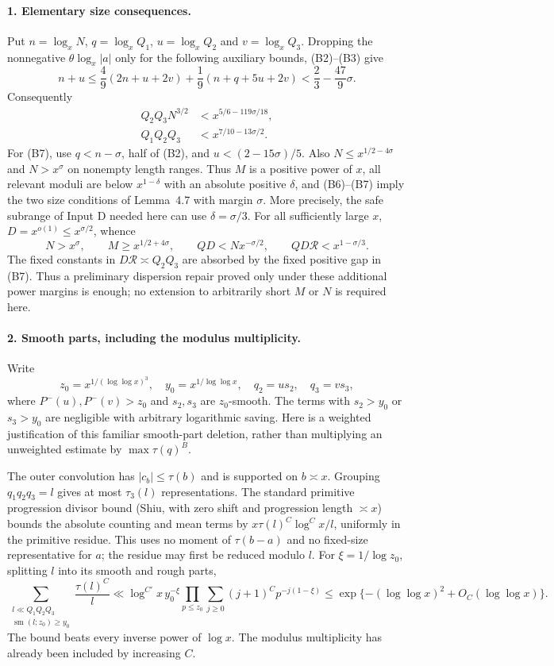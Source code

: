 \paragraph{1. Elementary size consequences.}
Put $n=\log_xN$, $q=\log_xQ_1$, $u=\log_xQ_2$ and
$v=\log_xQ_3$. Dropping the nonnegative $\theta\log_x|a|$
only for the following auxiliary bounds, (B2)--(B3) give
\[
 n+u\le\frac49(2n+u+2v)+\frac19(n+q+5u+2v)
 <\frac23-\frac{47}{9}\sigma.
\]
Consequently
\begin{align}
 Q_2Q_3N^{3/2}&<x^{5/6-119\sigma/18},                    \tag{B6}\\
 Q_1Q_2Q_3&<x^{7/10-13\sigma/2}.                         \tag{B7}
\end{align}
For (B7), use $q<n-\sigma$, half of (B2), and
$u<(2-15\sigma)/5$. Also $N\le x^{1/2-4\sigma}$ and
$N>x^\sigma$ on nonempty length ranges. Thus $M$ is a positive
power of $x$, all relevant moduli are below $x^{1-\delta}$ with
an absolute positive $\delta$, and (B6)--(B7) imply the two size
conditions of Lemma~4.7 with margin $\sigma$.
More precisely, the safe subrange of Input D needed here can use
$\delta=\sigma/3$. For all sufficiently large $x$,
$D=x^{o(1)}\le x^{\sigma/2}$, whence
\[
 N>x^\sigma,\qquad M\ge x^{1/2+4\sigma},\qquad
 QD<Nx^{-\sigma/2},\qquad QD\mathcal R<x^{1-\sigma/3}.
\]
The fixed constants in $D\mathcal R\asymp Q_2Q_3$ are absorbed
by the fixed positive gap in (B7). Thus a preliminary dispersion
repair proved only under these additional power margins is enough;
no extension to arbitrarily short $M$ or $N$ is required here.

\paragraph{2. Smooth parts, including the modulus multiplicity.}
Write
\[
 z_0=x^{1/(\log\log x)^3},\quad y_0=x^{1/\log\log x},
 \quad q_2=u s_2,\quad q_3=v s_3,
\]
where $P^-(u),P^-(v)>z_0$ and $s_2,s_3$ are $z_0$-smooth.
The terms with $s_2>y_0$ or $s_3>y_0$ are negligible with arbitrary
logarithmic saving. Here is a weighted justification of this familiar
smooth-part deletion, rather than multiplying an unweighted estimate
by $\max\tau(q)^B$.

The outer convolution has $|c_b|\le\tau(b)$ and is supported on
$b\asymp x$. Grouping $q_1q_2q_3=l$ gives at most $\tau_3(l)$
representations. The standard primitive progression divisor bound
(Shiu, with zero shift and progression length $\asymp x$) bounds
the absolute counting and mean terms by
$x\tau(l)^C\log^C x/l$, uniformly in the primitive residue.
This uses no moment of $\tau(b-a)$ and no fixed-size representative
for $a$; the residue may first be reduced modulo $l$.
For $\xi=1/\log z_0$, splitting $l$ into its smooth and rough parts,
\[
 \sum_{\substack{l\ll Q_1Q_2Q_3\\\operatorname{sm}(l;z_0)\ge y_0}}
       \frac{\tau(l)^C}{l}
 \ll \log^{C'}x\,y_0^{-\xi}
       \prod_{p\le z_0}\sum_{j\ge0}(j+1)^C p^{-j(1-\xi)}
 \le \exp\{- (\log\log x)^2+O_C(\log\log x)\}.             \tag{B8}
\]
The bound beats every inverse power of $\log x$. The modulus
multiplicity has already been included by increasing $C$.

